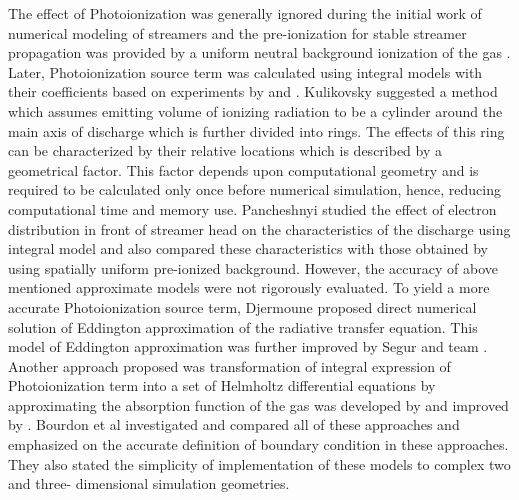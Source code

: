 \documentclass{article}
\begin{document}
The effect of Photoionization was generally ignored during the initial work of numerical modeling of streamers and the pre-ionization for stable streamer propagation was provided by a uniform neutral background ionization of the gas \cite{Dhali1987TwodimensionalGases}. Later, Photoionization source term was calculated using integral models with their coefficients based on experiments by \cite{Penney1970PhotoionizationNitrogen} and \cite{ZhelezniakM.B.andMnatsakanianA.K.andSizykh1982PhotoionizationDischarge}. Kulikovsky \cite{Kulikovsky2000TheDynamics} suggested a method which assumes emitting volume of ionizing radiation to be a cylinder around the main axis of discharge which is further divided into rings. The effects of this ring can be characterized by their relative locations which is described by a geometrical factor. This factor depends upon computational geometry and is required to be calculated only once before numerical simulation, hence, reducing computational time and memory use. Pancheshnyi \cite{Pancheshnyi2001RoleStreamer} studied the effect of electron distribution in front of streamer head on the characteristics of the discharge using integral model and also compared these characteristics with those obtained by using spatially uniform pre-ionized background. However, the accuracy of above mentioned approximate models were not rigorously evaluated. To yield a more accurate Photoionization source term, Djermoune \cite{Djermoune1995TwoDischarge} proposed direct numerical solution of Eddington approximation of the radiative transfer equation. This model of Eddington approximation was further improved by Segur and team \cite{Segur2006TheDischarges}. Another approach proposed was transformation of integral expression of Photoionization term into a set of Helmholtz differential equations by approximating the absorption function of the gas was developed by \cite{ZhelezniakM.B.andMnatsakanianA.K.andSizykh1982PhotoionizationDischarge} and improved by \cite{Luque2007PhotoionizationModes}. Bourdon et al \cite{Bourdon2007EfficientEquations} investigated and compared all of these approaches and emphasized on the accurate definition of boundary condition in these approaches. They also stated the simplicity of implementation of these models to complex two and three- dimensional simulation geometries.
\end{document}

